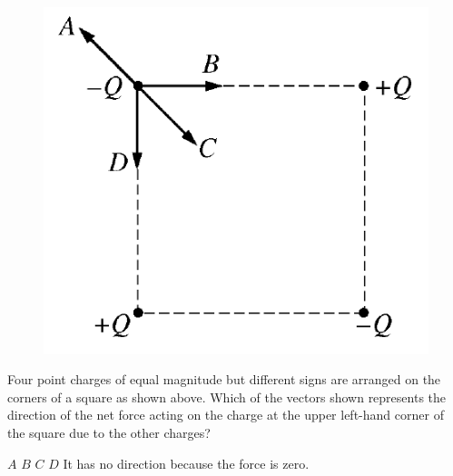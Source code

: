 \begin{figure}[H]
    \centering
    \includegraphics[scale=0.5]{images/35.png}
\end{figure}

\begin{questions}\setcounter{question}{34}\question
Four point charges of equal magnitude but different signs are arranged on the corners of a square as shown above. Which of the vectors shown represents the direction of the net force acting on the charge at the upper left-hand corner of the square due to the other charges?

\begin{choices}
\choice $A$
\choice $B$
\choice $C$
\choice $D$
\choice It has no direction because the force is zero.
\end{choices}\end{questions}
